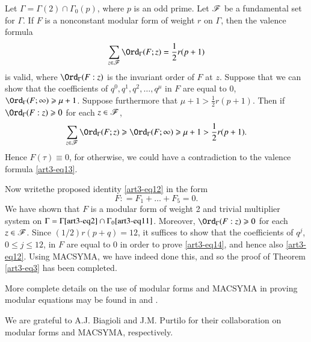 Let $\Gamma = \Gamma (2) \cap \Gamma_0 (p)$, where $p$ is an odd prime. Let $\mathscr{F}$ be a fundamental set for $\Gamma$. If $F$ is a nonconstant modular form of weight $r$ on $\Gamma$, then the valence formula 
\begin{equation}
\sum\limits_{z \in \sF} \Ord_\Gamma (F; z) = \frac{1}{2} r (p+1) \label{art3-eq13}
\end{equation}
is valid, where $\Ord_\Gamma (F:z)$ is the invariant order of $F$ at $z$. Suppose that we can show that the coefficients of $q^0, q^1, q^2, \ldots, q^\mu$ in $F$ are equal to $0$, \ie $\Ord_\Gamma (F; \infty) \geqslant \mu+1$. Suppose furthermore that $\mu+1 >\frac{1}{2} r (p+1)$. Then if $\Ord_\Gamma (F:z) \geqslant 0$ for each $z \in \mathscr{F}$,
$$
\sum\limits_{z \in \sF} \Ord_\Gamma (F; z) \geqslant \Ord_\Gamma (F; \infty)\geqslant \mu+ 1 > \frac{1}{2} r (p+1).
$$
Hence $F(\tau) \equiv 0$, for otherwise, we could have a contradiction to the valence formula \eqref{art3-eq13}.

Now write\pageoriginale the proposed identity \eqref{art3-eq12} in the form
\begin{equation}
F: = F_1 + \ldots + F_5 = 0. \label{art3-eq14}
\end{equation}
We have shown that $F$ is a modular form of weight 2 and trivial multiplier system on $\Gamma = \Gamma \eqref{art3-eq2} \cap \Gamma_0 \eqref{art3-eq11}$. Moreover, $\Ord_\Gamma (F:z) \geqslant 0$ for each $z \in \mathscr{F}$. Since $(1/2) r(p+q) =12$, it suffices to show that the coefficients of $q^j$, $0\leqslant j \leqslant 12$, in $F$ are equal to 0 in order to prove \eqref{art3-eq14}, and hence also \eqref{art3-eq12}. Using MACSYMA, we have indeed done this, and so the proof of Theorem \eqref{art3-eq3} has been completed. 

More complete details on the use of modular forms and MACSYMA in proving modular equations may be found in \cite{art3-key2} and \cite{art3-key4}.

We are grateful to A.J. Biagioli and J.M. Purtilo for their collaboration on modular forms and MACSYMA, respectively.


